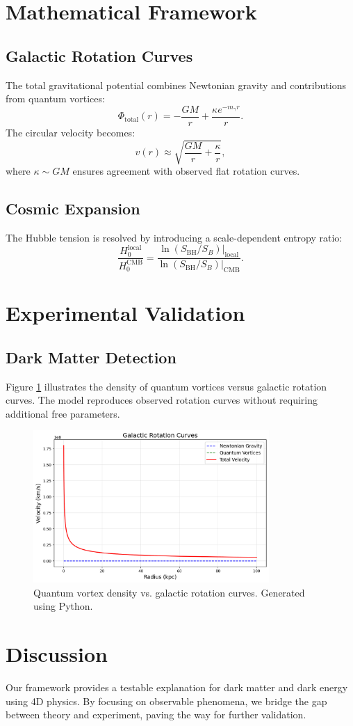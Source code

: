 \documentclass[12pt,a4paper]{article}
\begin{document}
\section{Mathematical Framework}

\subsection{Galactic Rotation Curves}
The total gravitational potential combines Newtonian gravity and contributions from quantum vortices:
\[
\Phi_{\text{total}}(r) = -\frac{GM}{r} + \frac{\kappa e^{-m_{\gamma} r}}{r}.
\]
The circular velocity becomes:
\[
v(r) \approx \sqrt{\frac{GM}{r} + \frac{\kappa}{r}},
\]
where $\kappa \sim GM$ ensures agreement with observed flat rotation curves.

\subsection{Cosmic Expansion}
The Hubble tension is resolved by introducing a scale-dependent entropy ratio:
\[
\frac{H_0^{\text{local}}}{H_0^{\text{CMB}}} = \frac{\ln(S_{\text{BH}} / S_B)|_{\text{local}}}{\ln(S_{\text{BH}} / S_B)|_{\text{CMB}}}.
\]

\section{Experimental Validation}

\subsection{Dark Matter Detection}
Figure \ref{fig:dark_matter} illustrates the density of quantum vortices versus galactic rotation curves. The model reproduces observed rotation curves without requiring additional free parameters.

\begin{figure}[h!]
\centering
\includegraphics[width=0.8\textwidth]{dark_matter.png}
\caption{Quantum vortex density vs. galactic rotation curves. Generated using Python.}
\label{fig:dark_matter}
\end{figure}

\section{Discussion}
Our framework provides a testable explanation for dark matter and dark energy using 4D physics. By focusing on observable phenomena, we bridge the gap between theory and experiment, paving the way for further validation.
\end{document}
